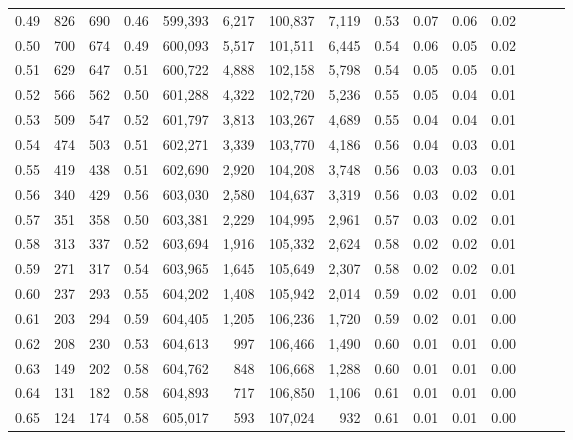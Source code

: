 \begin{tabular}{rrrrrrrrrrrrrrr}
0.49 &     826 &    690 &  0.46 &  599,393 &    6,217 &  100,837 &    7,119 &  0.53 &  0.07 &  0.06 &      0.02 \\
0.50 &     700 &    674 &  0.49 &  600,093 &    5,517 &  101,511 &    6,445 &  0.54 &  0.06 &  0.05 &      0.02 \\
0.51 &     629 &    647 &  0.51 &  600,722 &    4,888 &  102,158 &    5,798 &  0.54 &  0.05 &  0.05 &      0.01 \\
0.52 &     566 &    562 &  0.50 &  601,288 &    4,322 &  102,720 &    5,236 &  0.55 &  0.05 &  0.04 &      0.01 \\
0.53 &     509 &    547 &  0.52 &  601,797 &    3,813 &  103,267 &    4,689 &  0.55 &  0.04 &  0.04 &      0.01 \\
0.54 &     474 &    503 &  0.51 &  602,271 &    3,339 &  103,770 &    4,186 &  0.56 &  0.04 &  0.03 &      0.01 \\
0.55 &     419 &    438 &  0.51 &  602,690 &    2,920 &  104,208 &    3,748 &  0.56 &  0.03 &  0.03 &      0.01 \\
0.56 &     340 &    429 &  0.56 &  603,030 &    2,580 &  104,637 &    3,319 &  0.56 &  0.03 &  0.02 &      0.01 \\
0.57 &     351 &    358 &  0.50 &  603,381 &    2,229 &  104,995 &    2,961 &  0.57 &  0.03 &  0.02 &      0.01 \\
0.58 &     313 &    337 &  0.52 &  603,694 &    1,916 &  105,332 &    2,624 &  0.58 &  0.02 &  0.02 &      0.01 \\
0.59 &     271 &    317 &  0.54 &  603,965 &    1,645 &  105,649 &    2,307 &  0.58 &  0.02 &  0.02 &      0.01 \\
0.60 &     237 &    293 &  0.55 &  604,202 &    1,408 &  105,942 &    2,014 &  0.59 &  0.02 &  0.01 &      0.00 \\
0.61 &     203 &    294 &  0.59 &  604,405 &    1,205 &  106,236 &    1,720 &  0.59 &  0.02 &  0.01 &      0.00 \\
0.62 &     208 &    230 &  0.53 &  604,613 &      997 &  106,466 &    1,490 &  0.60 &  0.01 &  0.01 &      0.00 \\
0.63 &     149 &    202 &  0.58 &  604,762 &      848 &  106,668 &    1,288 &  0.60 &  0.01 &  0.01 &      0.00 \\
0.64 &     131 &    182 &  0.58 &  604,893 &      717 &  106,850 &    1,106 &  0.61 &  0.01 &  0.01 &      0.00 \\
0.65 &     124 &    174 &  0.58 &  605,017 &      593 &  107,024 &      932 &  0.61 &  0.01 &  0.01 &      0.00 \\

\end{tabular}
